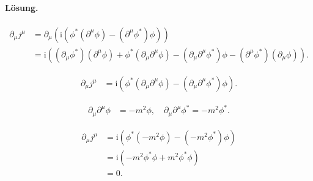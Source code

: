 \documentclass[11pt,a4paper]{article}
\begin{document}
\paragraph{Lösung.}

\begin{align*}
\partial_\mu j^\mu &= \partial_\mu \left( \mathrm{i} \left( \phi^* \left( \partial^\mu \phi \right) - \left( \partial^\mu \phi^* \right) \phi \right) \right) \\
&= \mathrm{i} \left( \left( \partial_\mu \phi^* \right) \left( \partial^\mu \phi \right) + \phi^* \left( \partial_\mu \partial^\mu \phi \right) - \left( \partial_\mu \partial^\mu \phi^* \right) \phi - \left( \partial^\mu \phi^* \right) \left( \partial_\mu \phi \right) \right).
\end{align*}


\begin{align*}
\partial_\mu j^\mu &= \mathrm{i} \left( \phi^* \left( \partial_\mu \partial^\mu \phi \right) - \left( \partial_\mu \partial^\mu \phi^* \right) \phi \right).
\end{align*}


\begin{align*}
\partial_\mu \partial^\mu \phi &= -m^2 \phi, \quad \partial_\mu \partial^\mu \phi^* = -m^2 \phi^*.
\end{align*}


\begin{align*}
\partial_\mu j^\mu &= \mathrm{i} \left( \phi^* (-m^2 \phi) - (-m^2 \phi^*) \phi \right) \\
&= \mathrm{i} \left( -m^2 \phi^* \phi + m^2 \phi^* \phi \right) \\
&= 0.
\end{align*}


\end{document}
